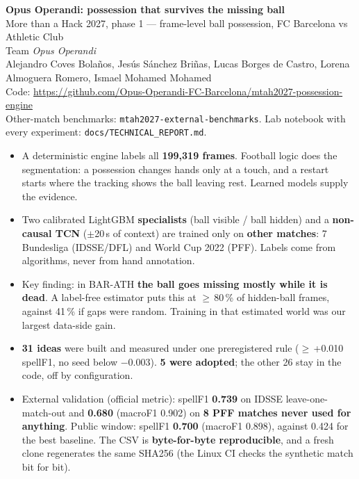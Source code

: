 \documentclass[10pt,a4paper]{article}
\newcommand{\code}[1]{\texttt{\small #1}}
\begin{document}
\begin{center}
{\LARGE\bfseries\color{oink} Opus Operandi: possession that survives the missing ball}\\[4pt]
{\large More than a Hack 2027, phase 1 --- frame-level ball possession, FC Barcelona vs Athletic Club}\\[6pt]
Team \textit{Opus Operandi}\\
Alejandro Coves Bolaños, Jesús Sánchez Briñas, Lucas Borges de Castro, Lorena Almoguera Romero, Ismael Mohamed Mohamed\\[2pt]
Code: \url{https://github.com/Opus-Operandi-FC-Barcelona/mtah2027-possession-engine}\\
{\small Other-match benchmarks: \code{mtah2027-external-benchmarks}. Lab notebook with every experiment: \code{docs/TECHNICAL\_REPORT.md}.}
\end{center}

\begin{tcolorbox}[colback=oboxbg,colframe=oblue,boxrule=0.8pt,arc=2pt,left=8pt,right=8pt,top=4pt,bottom=4pt,
  title={\bfseries At a glance},coltitle=oink,colbacktitle=oboxbg,toptitle=2pt,bottomtitle=0pt]
\begin{itemize}
\item A deterministic engine labels all \textbf{199,319 frames}. Football logic does the segmentation: a possession changes hands only at a touch, and a restart starts where the tracking shows the ball leaving rest. Learned models supply the evidence.
\item Two calibrated LightGBM \textbf{specialists} (ball visible / ball hidden) and a \textbf{non-causal TCN} ($\pm$20\,s of context) are trained only on \textbf{other matches}: 7 Bundesliga (IDSSE/DFL) and World Cup 2022 (PFF). Labels come from algorithms, never from hand annotation.
\item Key finding: in BAR-ATH \textbf{the ball goes missing mostly while it is dead}. A label-free estimator puts this at $\geq$\,80\,\% of hidden-ball frames, against 41\,\% if gaps were random. Training in that estimated world was our largest data-side gain.
\item \textbf{31 ideas} were built and measured under one preregistered rule ($\geq$\,+0.010 spellF1, no seed below $-0.003$). \textbf{5 were adopted}; the other 26 stay in the code, off by configuration.
\item External validation (official metric): spellF1 \textbf{0.739} on IDSSE leave-one-match-out and \textbf{0.680} (macroF1 0.902) on \textbf{8 PFF matches never used for anything}. Public window: spellF1 \textbf{0.700} (macroF1 0.898), against 0.424 for the best baseline. The CSV is \textbf{byte-for-byte reproducible}, and a fresh clone regenerates the same SHA256 (the Linux CI checks the synthetic match bit for bit).
\end{itemize}
\end{tcolorbox}
\end{document}
